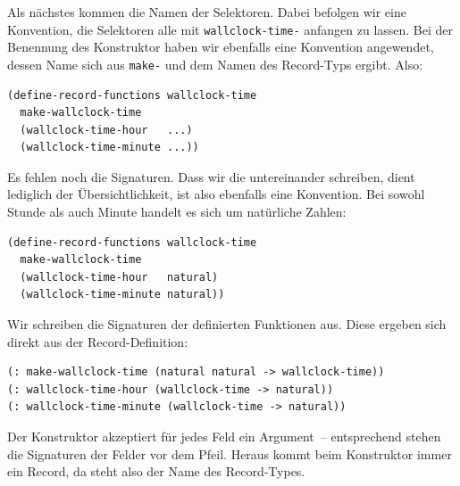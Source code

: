 \mantraschreib*

\noindent Als nächstes kommen die Namen der Selektoren.  Dabei befolgen wir eine
Konvention, die Selektoren alle mit \texttt{wallclock-time-} anfangen
zu lassen.  Bei der Benennung des Konstruktor haben wir ebenfalls
eine Konvention angewendet, dessen Name sich aus \texttt{make-} und
dem Namen des Record-Typs ergibt.  Also:
%
\begin{verbatim}
(define-record-functions wallclock-time
  make-wallclock-time
  (wallclock-time-hour   ...)
  (wallclock-time-minute ...))
\end{verbatim}
%
Es fehlen noch die Signaturen.  Dass wir die untereinander schreiben,
dient lediglich der Übersichtlichkeit, ist also ebenfalls eine
Konvention.  Bei sowohl Stunde als auch Minute handelt es sich um
natürliche Zahlen:
%
\begin{verbatim}
(define-record-functions wallclock-time
  make-wallclock-time
  (wallclock-time-hour   natural)
  (wallclock-time-minute natural))
\end{verbatim}
%
Wir schreiben die Signaturen der definierten Funktionen aus.  Diese
ergeben sich direkt aus der Record-Definition:
%
\begin{verbatim}
(: make-wallclock-time (natural natural -> wallclock-time))
(: wallclock-time-hour (wallclock-time -> natural))
(: wallclock-time-minute (wallclock-time -> natural))
\end{verbatim}
%
Der Konstruktor akzeptiert für jedes Feld ein Argument~-- entsprechend
stehen die Signaturen der Felder vor dem Pfeil.  Heraus kommt beim
Konstruktor immer ein Record, da steht also der Name des Record-Types.

